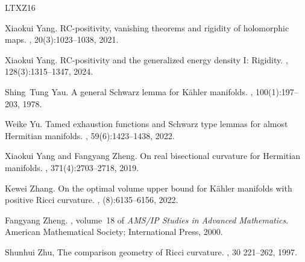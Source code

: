 \documentclass[12pt]{amsart}
\theoremstyle{plain}
\theoremstyle{definition}
\renewcommand{\>}{\rightarrow}
\numberwithin{equation}{section} %
\begin{document}
\begin{thebibliography}{LTXZ16}
	
	Xiaokui Yang.
	\newblock RC-positivity, vanishing theorems and rigidity of holomorphic maps.
	, 20(3):1023--1038, 2021.
	
	
	Xiaokui Yang.
	\newblock R{C}-positivity and the generalized energy density {I}: {R}igidity.
	, 128(3):1315--1347, 2024.
	
	
	Shing~Tung Yau.
	\newblock A general {S}chwarz lemma for {K}\"ahler manifolds.
	, 100(1):197--203, 1978.
	
	
	Weike Yu.
	\newblock Tamed exhaustion functions and {S}chwarz type lemmas for almost {H}ermitian manifolds.
	, 59(6):1423--1438, 2022.
	
	Xiaokui Yang and Fangyang Zheng.
	\newblock On real bisectional curvature for {H}ermitian manifolds.
	, 371(4):2703--2718, 2019.
	
	Kewei Zhang.
	\newblock On the optimal volume upper bound for {K}\"ahler manifolds with positive {R}icci curvature.
	, (8):6135--6156, 2022.
	
	Fangyang Zheng.
	, volume~18 of {\em AMS/IP Studies in Advanced Mathematics}.
	\newblock American Mathematical Society; International Press, 2000.
	
	Shunhui Zhu, 
	\newblock The comparison geometry of Ricci curvature.
	, 30  221--262, 1997.
	
	
	
\end{thebibliography}
\end{document}
